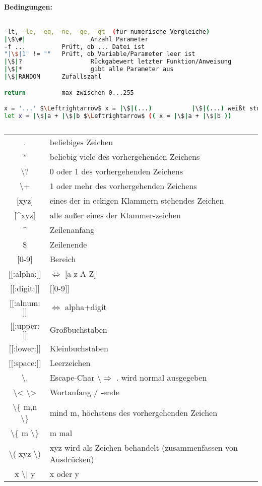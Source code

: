 \paragraph{Bedingungen:} $ $
\begin{lstlisting}[language=bash]
-lt, -le, -eq, -ne, -ge, -gt  (für numerische Vergleiche)
|\$\#|					Anzahl Parameter
-f ...			Prüft, ob ... Datei ist
"|\$|1" != ""	Prüft, ob Variable/Parameter leer ist
|\$|?					Rückgabewert letzter Funktion/Anweisung
|\$|*					gibt alle Parameter aus
|\$|RANDOM		Zufallszahl

return			max zwischen 0...255

x = '...' $\Leftrightarrow$ x = |\$|(...)			|\$|(...) weißt stdout einer Fkt einer Variablen zu
let x = |\$|a + |\$|b $\Leftrightarrow$ (( x = |\$|a + |\$|b ))
\end{lstlisting}

\subsection[Regex]{}
\begin{tabular}{c l}
. & beliebiges Zeichen\\
* & beliebig viele des vorhergehenden Zeichens\\
\textbackslash ? & 0 oder 1 des vorhergehenden Zeichens\\
\textbackslash + & 1 oder mehr des vorhergehenden Zeichens\\
$[$xyz$]$ & eines der in eckigen Klammern stehendes Zeichen\\
$[$\^{}xyz$]$ & alle außer eines der Klammer-zeichen\\
\^{} & Zeilenanfang\\
\$ & Zeilenende\\
$[$0-9$]$ & Bereich\\
$[[$:alpha:$]]$ & $\Leftrightarrow$ $[$a-z A-Z$]$\\
$[[$:digit:$]]$ & $[[$0-9$]]$\\
$[[$:alnum:$]]$ & $\Leftrightarrow$ alpha+digit\\
$[[$:upper:$]]$ & Großbuchstaben\\
$[[$:lower:$]]$ & Kleinbuchstaben\\
$[[$:space:$]]$ & Leerzeichen\\
\textbackslash . & Escape-Char \textbackslash $\Rightarrow$ . wird normal ausgegeben\\
\textbackslash < \textbackslash > & Wortanfang / -ende\\
\textbackslash \{ m,n \textbackslash \} & mind m, höchstens des vorhergehenden Zeichen\\
\textbackslash \{ m \textbackslash \} & m mal\\
\textbackslash ( xyz \textbackslash ) & xyz wird als Zeichen behandelt (zusammenfassen von Ausdrücken)\\
x \textbackslash | y & x oder y\\
\end{tabular}

